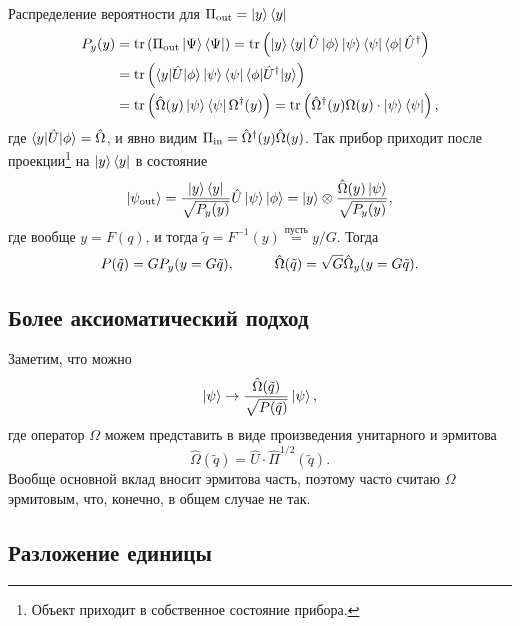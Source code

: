 Распределение вероятности для $\Pi_{\textnormal{out}} = \left| y \right\rangle \left\langle y \right|$
\begin{align*}
	P_y (y) &= \tr \left(
		\sub{\Pi}{out} \kb{\Psi}{\Psi}
	\right) = \tr\left(
		\kb{y}{y} \hat{U} \ket{\phi} \ket{\psi} \bra{\psi} \bra{\phi} \hat{U}\con
	\right) \\
	&= \tr\left(
		\bk{y}[\hat{U}]{\phi} \kb{\psi}{\psi} \bk{\phi}[\hat{U}\con]{y}
	\right)\\
	&= \tr\left(
		\hat{\Omega}(y) \kb{\psi}{\psi} \Omega\con (y)
	\right) = \tr\left(
		\hat{\Omega}\con (y) \Omega(y) \cdot \kb{\psi}{\psi}
	\right)
	,
\end{align*}
где $\bk{y}[\hat{U}]{\phi} = \hat{\Omega}$, и явно видим $\Pi_{\textnormal{in}} = \hat{\Omega}^{\dag}(y) \hat{\Omega}(y)$. Так прибор приходит после проекции\footnote{
	Объект приходит в собственное состояние прибора. 
}  на $\left| y \right\rangle \left\langle y \right|$ в состояние
\begin{equation*}
	\left| \psi_{\textnormal{out}} \right\rangle = \frac{\left| y \right\rangle \left\langle y \right|}{\sqrt{P_y (y)}} \hat{U} \left| \psi \right\rangle \left| \phi \right\rangle = \left| y \right\rangle \otimes \frac{\hat{\Omega}(y) \left| \psi \right\rangle}{\sqrt{P_y(y)}},
\end{equation*}
где вообще $y = F(q)$, и тогда  $\tilde{q} = F^{-1}(y) \overset{\text{пусть}}{=}  y/G$. Тогда
\begin{equation*}
	P(\tilde{q}) = G P_y (y = G \tilde{q}),
	\hspace{10 mm} 
	\hat{\Omega}(\tilde{q}) = \sqrt{G} \hat{\Omega}_y (y=G \tilde{q}).
\end{equation*}


\subsection*{Более аксиоматический подход}


Заметим, что можно
\begin{equation*}
	\left| \psi \right\rangle \to \frac{\hat{\Omega}(\tilde{q})}{\sqrt{P(\tilde{q})}} \left| \psi \right\rangle,
\end{equation*}
где оператор $\Omega$ можем представить в виде произведения унитарного и эрмитова
\begin{equation*}
	\hat{\Omega} (\tilde{q}) = \hat{U} \cdot \hat{\Pi}^{1/2} (\tilde{q}).
\end{equation*}
Вообще основной вклад вносит эрмитова часть, поэтому часто считаю $\Omega$ эрмитовым, что, конечно, в общем случае не так. 


\subsection*{Разложение единицы}

